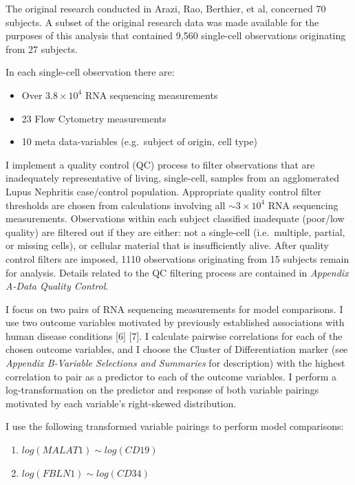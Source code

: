 \documentclass[12pt,]{article}
\providecommand{\tightlist}{%
  \setlength{\itemsep}{0pt}\setlength{\parskip}{0pt}}
\begin{document}
The original research conducted in Arazi, Rao, Berthier, et al,
concerned 70 subjects. A subset of the original research data was made
available for the purposes of this analysis that contained 9,560
single-cell observations originating from 27 subjects.

In each single-cell observation there are:

\begin{itemize}
\tightlist
\item
  Over \(3.8 \times 10^{4}\) RNA sequencing measurements
\item
  23 Flow Cytometry measurements
\item
  10 meta data-variables (e.g.~subject of origin, cell type)
\end{itemize}

I implement a quality control (QC) process to filter observations that
are inadequately representative of living, single-cell, samples from an
agglomerated Lupus Nephritis case/control population. Appropriate
quality control filter thresholds are chosen from calculations involving
all \(\sim 3 \times 10^{4}\) RNA sequencing measurements. Observations
within each subject classified inadequate (poor/low quality) are
filtered out if they are either: not a single-cell (i.e.~multiple,
partial, or missing cells), or cellular material that is insufficiently
alive. After quality control filters are imposed, 1110 observations
originating from 15 subjects remain for analysis. Details related to the
QC filtering process are contained in
\textit{Appendix A-Data Quality Control}.

I focus on two pairs of RNA sequencing measurements for model
comparisons. I use two outcome variables motivated by previously
established associations with human disease conditions {[}6{]} {[}7{]}.
I calculate pairwise correlations for each of the chosen outcome
variables, and I choose the Cluster of Differentiation marker (see
\textit{Appendix B-Variable Selections and Summaries} for description)
with the highest correlation to pair as a predictor to each of the
outcome variables. I perform a log-transformation on the predictor and
response of both variable pairings motivated by each variable's
right-skewed distribution.

I use the following transformed variable pairings to perform model
comparisons:

\begin{enumerate}
\def\labelenumi{\arabic{enumi}.}
\tightlist
\item
  \(log(MALAT1) \sim log(CD19)\)
\item
  \(log(FBLN1) \sim log(CD34)\)
\end{enumerate}
\end{document}
